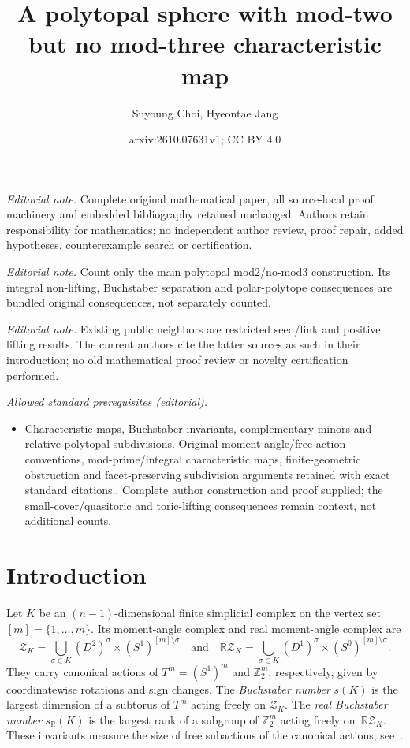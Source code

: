 \documentclass[10pt,a4paper]{amsart}
\title{A polytopal sphere with mod-two but no mod-three characteristic map}
\author{Suyoung Choi, Hyeontae Jang}
\date{arxiv:2610.07631v1; CC BY 4.0}
\theoremstyle{plain}
\numberwithin{equation}{section}
\theoremstyle{remark}
\theoremstyle{definition}
\newcommand{\Z}{\mathbb Z}
\newcommand{\cZ}{\mathcal Z}
\newcommand{\RZ}{\mathbb R \mathcal Z}
\newcommand{\R}{\mathbb R}
\newcommand{\wideand}{\quad \text{and} \quad}
\begin{document}
\maketitle
\noindent\textit{Editorial note.} Complete original mathematical paper, all source-local proof machinery and embedded bibliography retained unchanged. Authors retain responsibility for mathematics; no independent author review, proof repair, added hypotheses, counterexample search or certification.\par\medskip
\noindent\textit{Editorial note.} Count only the main polytopal mod2/no-mod3 construction. Its integral non-lifting, Buchstaber separation and polar-polytope consequences are bundled original consequences, not separately counted.\par\medskip
\noindent\textit{Editorial note.} Existing public neighbors are restricted seed/link and positive lifting results. The current authors cite the latter sources as such in their introduction; no old mathematical proof review or novelty certification performed.\par\medskip
\noindent\textit{Allowed standard prerequisites (editorial).}\begin{itemize}
\item Characteristic maps, Buchstaber invariants, complementary minors and relative polytopal subdivisions. Original moment-angle/free-action conventions, mod-prime/integral characteristic maps, finite-geometric obstruction and facet-preserving subdivision arguments retained with exact standard citations.. Complete author construction and proof supplied; the small-cover/quasitoric and toric-lifting consequences remain context, not additional counts.
\end{itemize}\medskip
\section{Introduction}
Let $K$ be an $(n-1)$-dimensional finite simplicial complex on the vertex set~$[m]=\{1,\ldots,m\}$. 
Its moment-angle complex and real moment-angle complex are
$$
    \cZ_K=\bigcup_{\sigma\in K}(D^2)^\sigma\times(S^1)^{[m]\setminus\sigma} \wideand \RZ_K=\bigcup_{\sigma\in K}(D^1)^\sigma\times(S^0)^{[m]\setminus\sigma}.
$$
They carry canonical actions of $T^m=(S^1)^m$ and $\Z_2^m$, respectively, given by coordinatewise rotations and sign changes. 
The \emph{Buchstaber number} $s(K)$ is the largest dimension of a subtorus of $T^m$ acting freely on $\cZ_K$.
The \emph{real Buchstaber number} $s_{\R}(K)$ is the largest rank of a subgroup of $\Z_2^m$ acting freely on~$\RZ_K$. 
These invariants measure the size of free subactions of the canonical actions; see~\cite{Fukukawa-Masuda2011, Erokhovets2014, Buchstaber-Panov2015book}.
\end{document}
